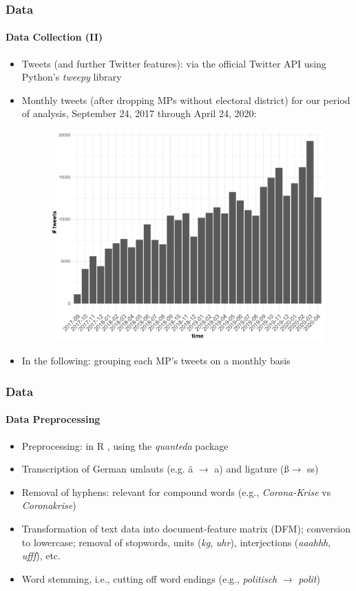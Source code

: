 \documentclass[xcolor=dvipsnames]{beamer}
\begin{document}
\begin{frame}
\frametitle{Data}
\framesubtitle{Data Collection (II)}
\begin{itemize}
\item Tweets (and further Twitter features): via the official Twitter API using Python's \textit{tweepy} library\parencite{roesslein2020tweepy}
\item Monthly tweets (after dropping MPs without electoral district) for our period of analysis, September 24, 2017 through April 24, 2020:
	\begin{figure}[h!]
  	\centering
  	\includegraphics[scale = 0.25]{../plots/3/monthly_tweets.pdf}
	\end{figure}
\item In the following: grouping each MP's tweets on a monthly basis
\end{itemize}
\end{frame}

\begin{frame}
\frametitle{Data}
\framesubtitle{Data Preprocessing}
\begin{itemize}
\item Preprocessing: in R \parencite{R}, using the \textit{quanteda} package \parencite{quanteda}
\item Transcription of German umlauts (e.g. \"a $\rightarrow$ a) and ligature (\ss $\rightarrow$ ss)
\item Removal of hyphens: relevant for compound words (e.g., \textit{Corona-Krise} vs \textit{Coronakrise})
\item Transformation of text data into document-feature matrix (DFM); conversion to lowercase; removal of stopwords, units (\textit{kg}, \textit{uhr}), interjections (\textit{aaahhh}, \textit{ufff}), etc.
\item Word stemming, i.e., cutting off word endings (e.g., \textit{politisch} $\rightarrow$ \textit{polit}) \parencite{lucas2015computer}
\end{itemize}
\end{frame}
\end{document}
